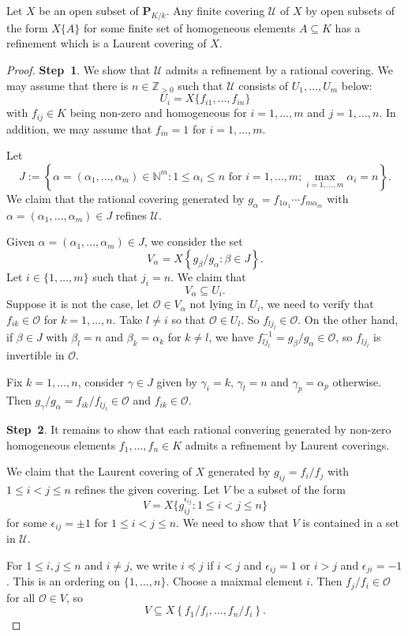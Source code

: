\begin{lemma}\label{lma-opencovlaurentrefrz}
    Let $X$ be an open subset of $\mathbf{P}_{K/k}$.
    Any finite covering $\mathcal{U}$ of $X$ by open subsets of the form $X\{A\}$ for some finite set of homogeneous elements $A\subseteq K$ has a refinement which is a Laurent covering of $X$. 
\end{lemma}
\begin{proof}
    \textbf{Step~1}. We show that $\mathcal{U}$ admits a refinement by a rational covering. We may assume that there is $n\in \mathbb{Z}_{>0}$ such that $\mathcal{U}$ consists of $U_1,\ldots,U_m$ below:
    \[
        U_i=X\{f_{i1},\ldots,f_{in}\}
    \]
    with $f_{ij}\in K$ being non-zero and homogeneous for $i=1,\ldots,m$ and $j=1,\ldots,n$. In addition, we may assume that $f_{in}=1$ for $i=1,\ldots,m$.

    Let 
    \[
        J:=\left\{ \alpha=(\alpha_1,\ldots,\alpha_m)\in \mathbb{N}^m: 1\leq \alpha_i\leq n\text{ for }i=1,\ldots,m; \max_{i=1,\ldots,m}\alpha_i=n \right\}.  
    \] 
    We claim that the rational covering generated by $g_{\alpha}=f_{1\alpha_1}\cdots f_{m\alpha_m}$ with $\alpha=(\alpha_1,\ldots,\alpha_m)\in J$ refines $\mathcal{U}$.

    Given $\alpha=(\alpha_1,\ldots,\alpha_m)\in J$, we consider the set 
    \[
        V_{\alpha}=X\left\{g_{\beta}/g_{\alpha} :\beta\in J \right\}.  
    \]
    Let $i\in \{1,\ldots,m\}$ such that $j_i=n$. We claim that
    \[
        V_{\alpha}\subseteq U_i.
    \]
    Suppose it is not the case, let $\mathcal{O}\in V_{\alpha}$ not lying in $U_i$, we need to verify that $f_{ik}\in \mathcal{O}$ for $k=1,\ldots,n$. 
    Take $l\neq i$ so that $\mathcal{O}\in U_l$. So $f_{lj_l}\in \mathcal{O}$. On the other hand, if $\beta\in J$ with $\beta_l=n$ and $\beta_k=\alpha_k$ for $k\neq l$, we have $f_{lj_l}^{-1}=g_{\beta}/g_{\alpha}\in \mathcal{O}$, so $f_{lj_l}$ is invertible in $\mathcal{O}$. 
    
    Fix $k=1,\ldots,n$, consider $\gamma\in J$ given by $\gamma_i=k$, $\gamma_l=n$ and $\gamma_p=\alpha_p$ otherwise. Then $g_{\gamma}/g_{\alpha}=f_{ik}/f_{lj_l}\in \mathcal{O}$ and $f_{ik}\in \mathcal{O}$.

    \textbf{Step~2}. It remains to show that each rational convering generated by non-zero homogeneous elements $f_1,\ldots,f_n \in K$ admits a refinement by Laurent coverings. 

    We claim that the Laurent covering of $X$ generated by $g_{ij}=f_i/f_j$ with $1\leq i<j\leq n$ refines the given covering. Let $V$ be a subset of the form
    \[
        V=X\{g_{ij}^{\epsilon_{ij}}:1\leq i<j\leq n\}  
    \]
    for some $\epsilon_{ij}=\pm 1$ for $1\leq i<j\leq n$. We need to show that $V$ is contained in a set in $\mathcal{U}$.

    For $1\leq i,j\leq n$ and $i\neq j$, we write $i\preceq j$ if $i<j$ and $\epsilon_{ij}=1$ or $i>j$ and $\epsilon_{ji}=-1$. This is an ordering on $\{1,\ldots,n\}$. Choose a maixmal element $i$. Then $f_j/f_i\in \mathcal{O}$ for all $\mathcal{O}\in V$, so 
    \[
        V\subseteq X\left\{f_1/f_i,\ldots,f_n/f_i \right\}.  
    \]
\end{proof}

